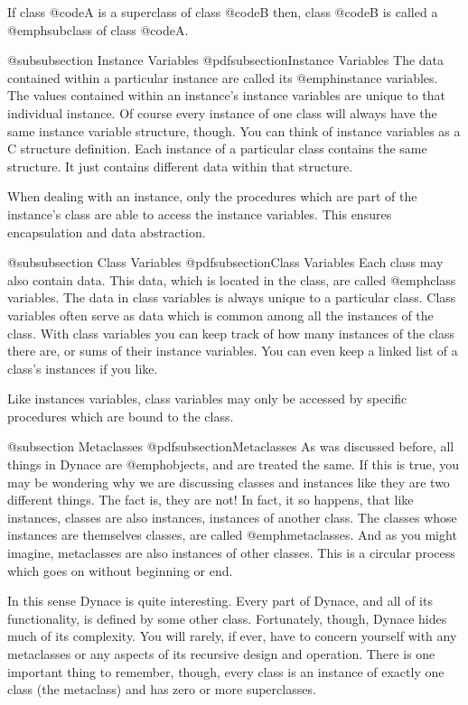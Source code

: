 If class @code{A} is a superclass of class @code{B} then, class @code{B}
is called a @emph{subclass} of class @code{A}.

@subsubsection Instance Variables
@pdfsubsection{Instance Variables}
The data contained within a particular instance are called its
@emph{instance variables}.  The values contained within an instance's
instance variables are unique to that individual instance.  Of course
every instance of one class will always have the same instance variable
structure, though.  You can think of instance variables as a C structure
definition.  Each instance of a particular class contains the same
structure.  It just contains different data within that structure.

When dealing with an instance, only the procedures which are part of the
instance's class are able to access the instance variables.  This
ensures encapsulation and data abstraction.

@subsubsection Class Variables
@pdfsubsection{Class Variables}
Each class may also contain data. This data, which is located in the class,
are called @emph{class variables}.  The data in class variables is always
unique to a particular class.  Class variables often serve as data which
is common among all the instances of the class.  With class variables
you can keep track of how many instances of the class there are, or
sums of their instance variables.  You can even keep a linked list of
a class's instances if you like.

Like instances variables, class variables may only be accessed by
specific procedures which are bound to the class.

@subsection Metaclasses
@pdfsubsection{Metaclasses}
As was discussed before, all things in Dynace are @emph{objects}, and
are treated the same.  If this is true, you may be wondering why we are
discussing classes and instances like they are two different things.
The fact is, they are not!  In fact, it so happens, that like instances,
classes are also instances, instances of another class.  The classes
whose instances are themselves classes, are called @emph{metaclasses}.
And as you might imagine, metaclasses are also instances of other
classes.  This is a circular process which goes on without beginning or
end.

In this sense Dynace is quite interesting.  Every part of Dynace, and all of
its functionality, is defined by some other class.  Fortunately, though,
Dynace hides much of its complexity.  You will rarely, if ever, have to
concern yourself with any metaclasses or any aspects of its recursive
design and operation.  There is one important thing to remember, though,
every class is an instance of exactly one class (the metaclass) and has
zero or more superclasses.

